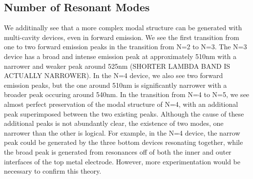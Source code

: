 \documentclass{report}
\begin{document}
        \subsection{Number of Resonant Modes} \label{numModes}
        We additinally see that a more complex modal structure can be generated with multi-cavity devices, even in forward emission. We see the first transition from one to two forward emission peaks in the transition from N=2 to N=3. The N=3 device has a broad and intense emission peak at approximately 510nm with a narrower and weaker peak around 525nm (SHORTER LAMBDA BAND IS ACTUALLY NARROWER). In the N=4 device, we also see two forward emission peaks, but the one around 510nm is significantly narrower with a broader peak occuring around 540nm. In the transition from N=4 to N=5, we see almost perfect preservation of the modal structure of N=4, with an additional peak superimposed between the two existing peaks. Although the cause of these additional peaks is not abundantly clear, the existence of two modes, one narrower than the other is logical. For example, in the N=4 device, the narrow peak could be generated by the three bottom devices resonating together, while the broad peak is generated from resonances off of both the inner and outer interfaces of the top metal electrode. However, more experimentation would be necessary to confirm this theory.
\end{document}
